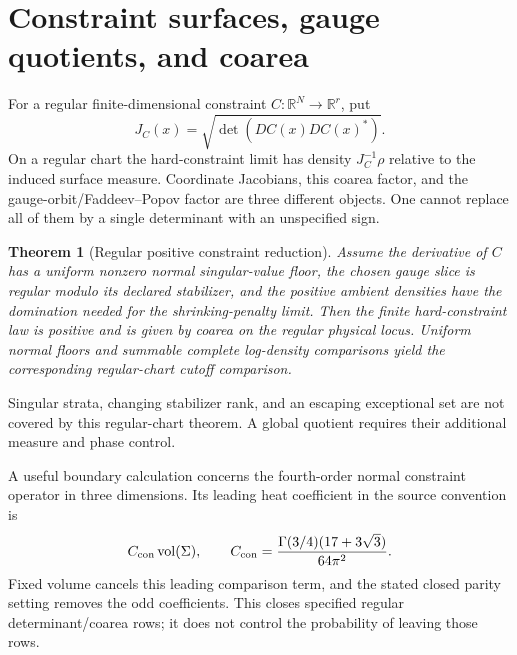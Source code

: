 \documentclass[11pt,a4paper,oneside]{book}
\theoremstyle{plain}
\newtheorem{theorem}{Theorem}[chapter]
\theoremstyle{definition}
\theoremstyle{remark}
\newcommand{\R}{\mathbb R}
\newcommand{\vol}{\operatorname{vol}}
\newcommand{\src}[2]{\cite{#1}}
\begin{document}
\section{Constraint surfaces, gauge quotients, and coarea}
For a regular finite-dimensional constraint $C:\R^N\to\R^r$, put
\begin{equation}
 J_C(x)=\sqrt{\det(DC(x)DC(x)^*)}.
\end{equation}
On a regular chart the hard-constraint limit has density $J_C^{-1}\rho$ relative to the induced surface measure. Coordinate Jacobians, this coarea factor, and the gauge-orbit/Faddeev--Popov factor are three different objects. One cannot replace all of them by a single determinant with an unspecified sign. \src{R10}{prop:v44-three-determinants}

\begin{theorem}[Regular positive constraint reduction]
\label{thm:coarea}
Assume the derivative of $C$ has a uniform nonzero normal singular-value floor, the chosen gauge slice is regular modulo its declared stabilizer, and the positive ambient densities have the domination needed for the shrinking-penalty limit. Then the finite hard-constraint law is positive and is given by coarea on the regular physical locus. Uniform normal floors and summable complete log-density comparisons yield the corresponding regular-chart cutoff comparison.
\end{theorem}
\src{R8}{thm:e8v58-coarea,thm:e8v83-second-coarea,thm:e8v99-coarea-ratio}
Singular strata, changing stabilizer rank, and an escaping exceptional set are not covered by this regular-chart theorem. A global quotient requires their additional measure and phase control.

A useful boundary calculation concerns the fourth-order normal constraint operator in three dimensions. Its leading heat coefficient in the source convention is
\begin{equation}
 C_{\rm con}\vol(\Sigma),\qquad
 C_{\rm con}=\frac{\Gamma(3/4)(17+3\sqrt3)}{64\pi^2}.
 \label{eq:coarea-heat}
\end{equation}
Fixed volume cancels this leading comparison term, and the stated closed parity setting removes the odd coefficients. This closes specified regular determinant/coarea rows; it does not control the probability of leaving those rows. \cite{R8}
\end{document}
